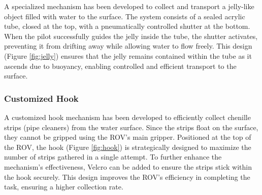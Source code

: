 A specialized mechanism has been developed to collect and transport a jelly-like object filled with water to the surface. The system consists of a sealed acrylic tube, closed at the top, with a pneumatically controlled shutter at the bottom. When the pilot successfully guides the jelly inside the tube, the shutter activates, preventing it from drifting away while allowing water to flow freely. This design (Figure \ref{fig:jelly}) ensures that the jelly remains contained within the tube as it ascends due to buoyancy, enabling controlled and efficient transport to the surface.

\subsubsection{Customized Hook}

A customized hook mechanism has been developed to efficiently collect chenille strips (pipe cleaners) from the water surface. Since the strips float on the surface, they cannot be gripped using the ROV’s main gripper. Positioned at the top of the ROV, the hook (Figure \ref{fig:hook}) is strategically designed to maximize the number of strips gathered in a single attempt. To further enhance the mechanism’s effectiveness, Velcro can be added to ensure the strips stick within the hook securely. This design improves the ROV’s efficiency in completing the task, ensuring a higher collection rate.

